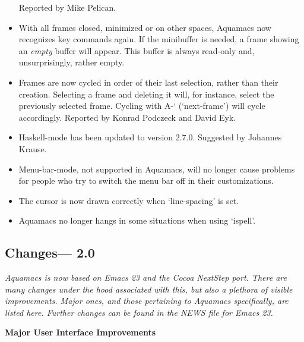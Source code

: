 \begin{itemize}
Reported by Mike Pelican.
\item With all frames closed, minimized or on other spaces, Aquamacs now recognizes key commands again.  If the minibuffer is needed, a frame showing an \emph{empty} buffer will appear.  This buffer is always read-only and, unsurprisingly, rather empty.
\item Frames are now cycled in order of their last selection, rather than their creation.  Selecting a frame and deleting it will, for instance, select the previously selected frame.  Cycling with A-` (`next-frame')  will cycle accordingly.
Reported by Konrad Podczeck and David Eyk.
\item Haskell-mode has been updated to version 2.7.0.
Suggested by Johannes Krause.
\item Menu-bar-mode, not supported in Aquamacs, will no longer cause problems for people who try to switch the menu bar off in their customizations.
\item The cursor is now drawn correctly when `line-spacing' is set.
\item Aquamacs no longer hangs in some situations when using `ispell'.
\end{itemize}



\subsection{Changes--- 2.0}


\emph{Aquamacs is now based on Emacs 23 and the Cocoa NextStep port.  There are many changes under the hood associated with this, but also a plethora of visible improvements.  Major ones, and those pertaining to Aquamacs specifically, are listed here.  Further changes can be found in the NEWS file for Emacs 23.}


\textbf{Major User Interface Improvements}


